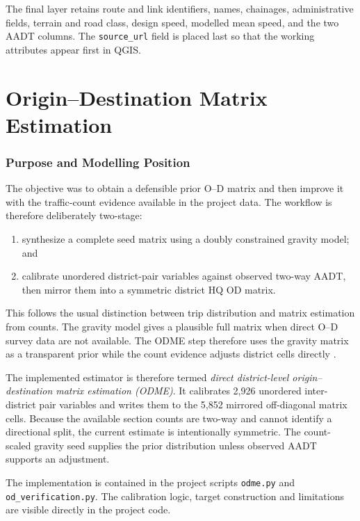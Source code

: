 \documentclass[11pt,a4paper]{article}
\newcommand{\od}{O--D}
\begin{document}
The final layer retains route and link identifiers, names, chainages,
administrative fields, terrain and road class, design speed, modelled mean
speed, and the two AADT columns. The \texttt{source\_url} field is placed last
so that the working attributes appear first in QGIS.

\part{Origin--Destination Matrix Estimation}

\section{Purpose and Modelling Position}

The objective was to obtain a defensible prior \od{} matrix and then improve it
with the traffic-count evidence available in the project data. The workflow is
therefore deliberately two-stage:

\begin{enumerate}
    \item synthesize a complete seed matrix using a doubly constrained gravity
    model; and
    \item calibrate unordered district-pair variables against observed two-way
    AADT, then mirror them into a symmetric district HQ OD matrix.
\end{enumerate}

This follows the usual distinction between trip distribution and matrix
estimation from counts. The gravity model gives a plausible full matrix when
direct \od{} survey data are not available. The ODME step therefore uses the
gravity matrix as a transparent prior while the count evidence adjusts district
cells directly
\cite{vanzuylen1980,spiess1987}.

The implemented estimator is therefore termed \emph{direct district-level
origin--destination matrix estimation (ODME)}. It calibrates 2,926 unordered
inter-district pair variables and writes them to the 5,852 mirrored off-diagonal
matrix cells. Because the available section counts are two-way and cannot
identify a directional split, the current estimate is intentionally symmetric.
The count-scaled gravity seed supplies the prior distribution unless observed
AADT supports an adjustment.

The implementation is contained in the project scripts
\texttt{odme.py} and \texttt{od\_verification.py}. The calibration logic,
target construction and limitations are visible directly in the project code.
\end{document}
